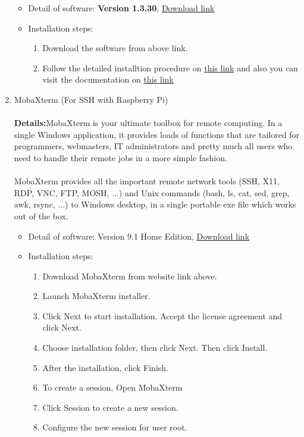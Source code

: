 \documentclass[a4paper,12pt,oneside]{book}
\begin{document}
\begin{enumerate}
\begin{itemize}
  \item Detail of software: \textbf{Version 1.3.30}, \href{http://firmware.ardupilot.org/Tools/MissionPlanner/MissionPlanner-latest.msi}{Download link}
  \item Installation steps:
    \begin{enumerate}
      \item Download the software from above link.
      \item Follow the detailed installtion procedure on \href{https://github.com/eYSIP-2016/Autonomous-Drone/blob/master/Tutorials/Calibarting-APM/Calibarting_the_APM-2.6.pdf}{this link} and also you can visit the documentation on \href{http://ardupilot.org/planner/docs/common-install-mission-planner.html}{this link}
    \end{enumerate}
  \end{itemize}
  \item MobaXterm (For SSH with Raspberry Pi)
    \paragraph{}\textbf{Details:}MobaXterm is your ultimate toolbox for remote computing. In a single Windows application, it provides loads of functions that are tailored for programmers, webmasters, IT administrators and pretty much all users who need to handle their remote jobs in a more simple fashion.
\paragraph{}
MobaXterm provides all the important remote network tools (SSH, X11, RDP, VNC, FTP, MOSH, ...) and Unix commands (bash, ls, cat, sed, grep, awk, rsync, ...) to Windows desktop, in a single portable exe file which works out of the box.
    \begin{itemize}
      \item Detail of software: Version 9.1 Home Edition, \href{http://mobaxterm.mobatek.net/download-home-edition.html}{Download link}
      \item Installation steps:
        \begin{enumerate}
          \item  Download MobaXterm from website link above.
          \item  Launch MobaXterm installer.
          \item Click Next to start installation. Accept the license agreement and click Next.
          \item Choose installation folder, then click Next. Then click Install.
          \item After the installation, click Finish.
          \item To create a session, Open MobaXterm
          \item Click Session to create a new session.
          \item Configure the new session for user root.
        \end{enumerate}
    \end{itemize}
\end{enumerate}
\end{document}
